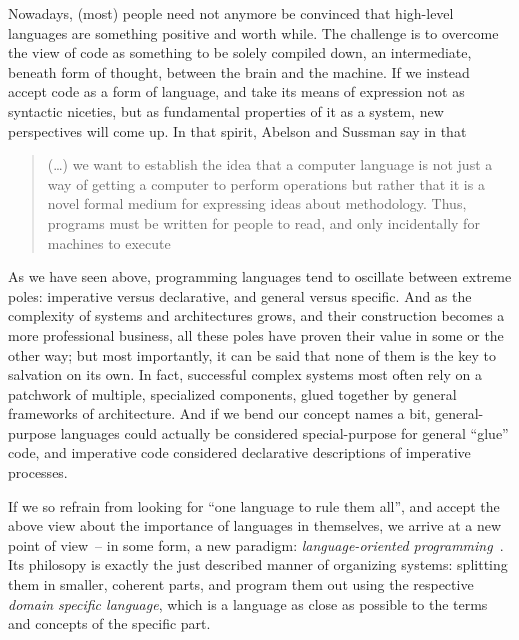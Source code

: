 Nowadays, (most) people need not anymore be convinced that high-level languages are something
positive and worth while. The challenge is to overcome the view of code as something to be solely
compiled down, an intermediate, beneath form of thought, between the brain and the machine. If we
instead accept code as a form of language, and take its means of expression not as syntactic
niceties, but as fundamental properties of it as a system, new perspectives will come up. In that
spirit, Abelson and Sussman say in  that \blockcquote[][Preface to
the First Edition]{abelson1996:structure}[.]{(\ldots\kern-1pt) we want to establish the idea that a
  computer language is not just a way of getting a computer to perform operations but rather that it
  is a novel formal medium for expressing ideas about methodology. Thus, programs must be written for
  people to read, and only incidentally for machines to execute}
\setlength{\parskip}{0cm} %

As we have seen above, programming languages tend to oscillate between extreme poles: imperative
versus declarative, and general versus specific. And as the complexity of systems and architectures
grows, and their construction becomes a more professional business, all these poles have proven
their value in some or the other way; but most importantly, it can be said that none of them is the
key to salvation on its own. In fact, successful complex systems most often rely on a patchwork of
multiple, specialized components, glued together by general frameworks of architecture. And if we
bend our concept names a bit, general-purpose languages could actually be considered special-purpose
for general \enquote{glue} code, and imperative code considered declarative descriptions of
imperative processes. 

If we so refrain from looking for \enquote{one language to rule them all}, and accept the above view
about the importance of languages in themselves, we arrive at a new point of view~-- in some form, a
new paradigm: \emph{language-oriented programming}~\cite{dmitriev2004:language}. Its philosopy is
exactly the just described manner of organizing systems: splitting them in smaller, coherent parts,
and program them out using the respective \emph{domain specific language}, which is a language as
close as possible to the terms and concepts of the specific part.

